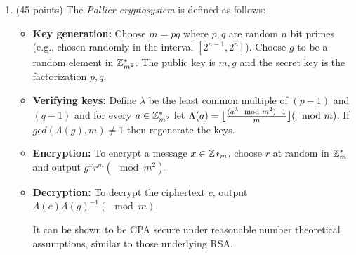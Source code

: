 \documentclass{article}
\begin{document}
\begin{enumerate}%

\item{}
(45 points) The \emph{Pallier  cryptosystem} is defined as follows:%

\begin{itemize}%

\item{}
\textbf{Key generation:} Choose $m=pq$ where $p,q$ are random $n$ bit primes (e.g., chosen randomly in the interval $[2^{n-1},2^n]$). Choose $g$ to be a random element in $\mathbb{Z}^*_{m^2}$. The public key is $m,g$ and the secret key is the factorization $p,q$. %

\item{}
\textbf{Verifying keys:} Define  $\lambda$ be the least common multiple of $(p-1)$ and $(q-1)$ and for every $a\in\mathbb{Z}^*_{m^2}$ let
$\Lambda(a)= \lfloor \tfrac{(a^\lambda \mod m^2)-1}{m} \rfloor (\mod m)$. If $gcd(\Lambda(g),m)\neq 1$ then regenerate the keys. %

\item{}
\textbf{Encryption:} To encrypt a message $x\in\mathbb{Z}*_m$, choose $r$ at random in $\mathbb{Z}^*_m$ and output $g^xr^m (\mod m^2)$.%

\item{}
\textbf{Decryption:} To decrypt the ciphertext $c$, output $\Lambda(c)\Lambda(g)^{-1} (\mod m)$. %

It can be shown to be CPA secure under reasonable number theoretical assumptions, similar to those underlying RSA.%

\begin{enumerate}[noitemsep,topsep=\mdcompacttopsep,label=\alph*.]%


\end{enumerate}
\end{itemize}
\end{enumerate}
\end{document}

